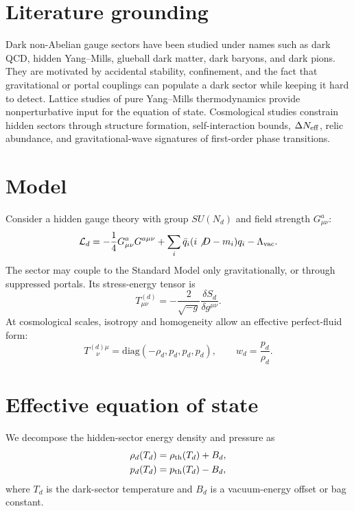 \documentclass[11pt]{article}
\theoremstyle{remark}
\begin{document}
\section{Literature grounding}

Dark non-Abelian gauge sectors have been studied under names such as dark QCD, hidden Yang--Mills, glueball dark matter, dark baryons, and dark pions. They are motivated by accidental stability, confinement, and the fact that gravitational or portal couplings can populate a dark sector while keeping it hard to detect. Lattice studies of pure Yang--Mills thermodynamics provide nonperturbative input for the equation of state. Cosmological studies constrain hidden sectors through structure formation, self-interaction bounds, $\Delta N_{\rm eff}$, relic abundance, and gravitational-wave signatures of first-order phase transitions.

\section{Model}

Consider a hidden gauge theory with group $SU(N_d)$ and field strength $G^a_{\mu\nu}$:
\begin{equation}
\mathcal L_d=-\frac14 G^a_{\mu\nu}G^{a\mu\nu}+\sum_i\bar q_i(i\not{D}-m_i)q_i-\Lambda_{\rm vac}.
\end{equation}
The sector may couple to the Standard Model only gravitationally, or through suppressed portals. Its stress-energy tensor is
\begin{equation}
T^{(d)}_{\mu\nu}=-\frac{2}{\sqrt{-g}}\frac{\delta S_d}{\delta g^{\mu\nu}}.
\end{equation}
At cosmological scales, isotropy and homogeneity allow an effective perfect-fluid form:
\begin{equation}
T^{(d)\mu}_{\quad\nu}=\mathrm{diag}(-\rho_d,p_d,p_d,p_d),\qquad w_d=\frac{p_d}{\rho_d}.
\end{equation}

\section{Effective equation of state}

We decompose the hidden-sector energy density and pressure as
\begin{align}
\rho_d(T_d) &= \rho_{\rm th}(T_d)+B_d,\\
p_d(T_d) &= p_{\rm th}(T_d)-B_d,
\end{align}
where $T_d$ is the dark-sector temperature and $B_d$ is a vacuum-energy offset or bag constant.
\end{document}
